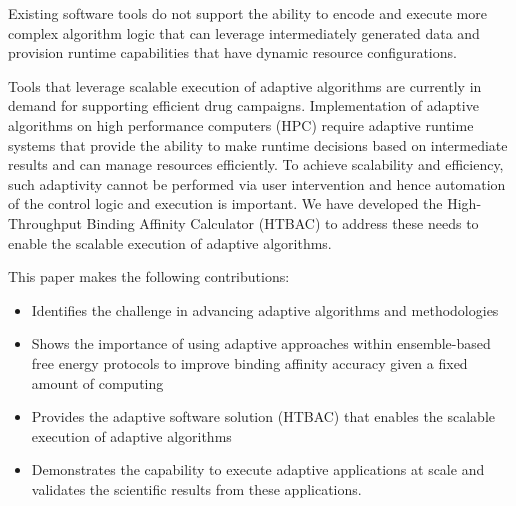  

Existing software tools do not support the ability to encode and execute more 
complex algorithm logic that can leverage intermediately generated data and 
provision runtime capabilities that have dynamic resource configurations. 

Tools that leverage scalable execution of adaptive algorithms are currently 
in demand for supporting efficient drug campaigns. Implementation of adaptive 
algorithms on high performance computers (HPC) require adaptive 
runtime systems that provide the ability to make runtime decisions based on 
intermediate results and can manage resources efficiently. To achieve 
scalability and efficiency, such adaptivity cannot be performed via user 
intervention and hence automation of the control logic and execution is 
important. We have developed the High-Throughput Binding Affinity Calculator 
(HTBAC) to address these needs to enable the scalable execution of adaptive 
algorithms. 



This paper makes the following contributions:
\begin{itemize}
  \item Identifies the challenge in advancing adaptive algorithms and 
  methodologies
  \item Shows the importance of using adaptive approaches within ensemble-based
  free energy protocols to improve binding affinity accuracy given a fixed 
  amount of computing
  \item Provides the adaptive software solution (HTBAC) that enables the 
  scalable execution of adaptive algorithms
  \item Demonstrates the capability to execute adaptive applications at scale 
  and validates the scientific results from these applications.
\end{itemize}

